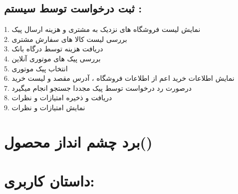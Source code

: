 \documentclass[12pt,onecolumn,a4paper]{article}
\begin{document}
\subsection{
ثبت درخواست توسط سیستم :
}
1.	نمایش لیست فروشگاه های نزدیک به مشتری و هزینه ارسال پیک\\
2.	بررسی لیست کالا های سفارش مشتری\\
3.	دریافت هزینه توسط درگاه بانک\\
4.	بررسی پیک های موتوری آنلاین\\
5.	انتخاب پیک موتوری\\
6.	نمایش اطلاعات خرید اعم از اطلاعات فروشگاه ، آدرس مقصد و لیست خرید\\
7.	درصورت رد درخواست توسط پیک مجددا جستجو انجام میگیرد\\
8.	دریافت و ذخیره امتیازات و نظرات\\
9.	نمایش امتیازات و نظرات\\

\newpage
\section{برد چشم انداز محصول\cite{3}()}
\begin{figure}[!h]
\caption{}\label{figpvb}
\end{figure}



\newpage

\section{داستان کاربری: }
\end{document}

